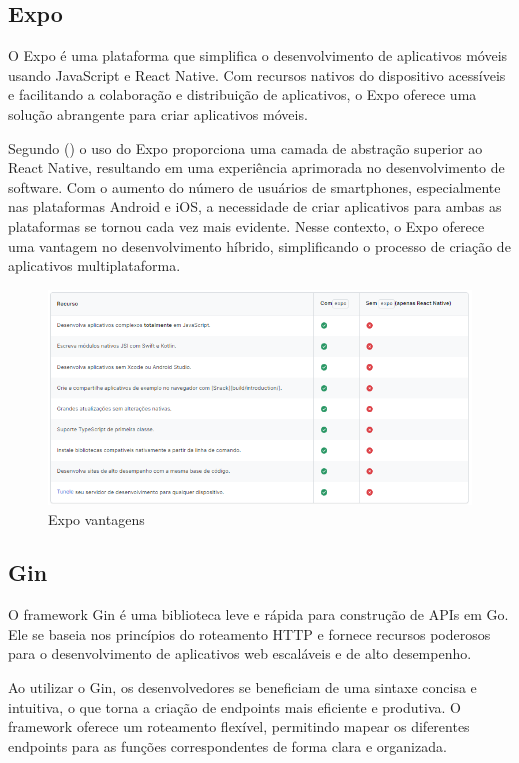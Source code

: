 \subsection{Expo}
O Expo é uma plataforma que simplifica o desenvolvimento de aplicativos móveis usando JavaScript e React Native. Com recursos nativos do dispositivo acessíveis e facilitando a colaboração e distribuição de aplicativos, o Expo oferece uma solução abrangente para criar aplicativos móveis.

Segundo (\textcite{Hugo}) o uso do Expo proporciona uma camada de abstração superior ao React Native, resultando em uma experiência aprimorada no desenvolvimento de software. Com o aumento do 
número de usuários de smartphones, especialmente nas plataformas Android e iOS, a necessidade de criar aplicativos para ambas as plataformas se tornou cada vez mais 
evidente. Nesse contexto, o Expo oferece uma vantagem no desenvolvimento híbrido, simplificando o processo de criação de aplicativos multiplataforma.


\begin{figure}[htb]
	\caption{\label{fig:Fig_1}Expo vantagens}
	\begin{center}
		\includegraphics{images/expo.png}
	\end{center}
\end{figure}

\subsection{Gin}
O framework Gin é uma biblioteca leve e rápida para construção de APIs em Go. Ele se baseia nos princípios do roteamento HTTP e fornece recursos poderosos para o desenvolvimento de aplicativos web escaláveis e de alto desempenho.

Ao utilizar o Gin, os desenvolvedores se beneficiam de uma sintaxe concisa e intuitiva, o que torna a criação de endpoints mais eficiente e produtiva. O framework oferece um roteamento flexível, permitindo mapear os diferentes endpoints para as funções correspondentes de forma clara e organizada.

